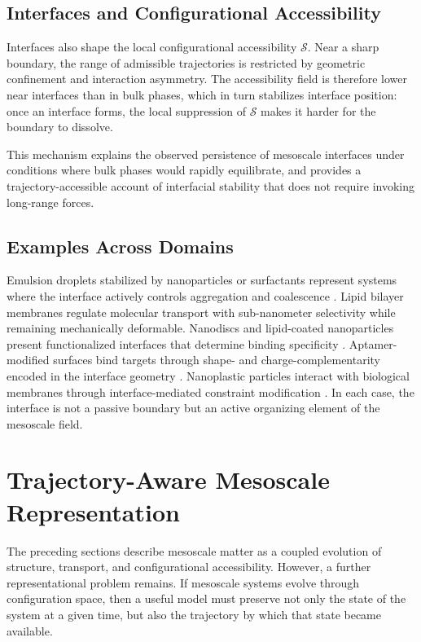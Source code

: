 \documentclass[11pt, a4paper, twocolumn]{article}
\newcommand{\Sfield}{\mathcal{S}}
\begin{document}
\subsection{Interfaces and Configurational Accessibility}

Interfaces also shape the local configurational accessibility $\Sfield$.
Near a sharp boundary, the range of admissible trajectories is restricted by
geometric confinement and interaction asymmetry. The accessibility field is
therefore lower near interfaces than in bulk phases, which in turn stabilizes
interface position: once an interface forms, the local suppression of $\Sfield$
makes it harder for the boundary to dissolve.

This mechanism explains the observed persistence of mesoscale interfaces under
conditions where bulk phases would rapidly equilibrate, and provides a
trajectory-accessible account of interfacial stability that does not require
invoking long-range forces.

\subsection{Examples Across Domains}

Emulsion droplets stabilized by nanoparticles or surfactants represent systems
where the interface actively controls aggregation and coalescence
\cite{larson2012,ye2026}. Lipid bilayer membranes regulate molecular transport
with sub-nanometer selectivity while remaining mechanically deformable. Nanodiscs
and lipid-coated nanoparticles present functionalized interfaces that determine
binding specificity \cite{villano2026}. Aptamer-modified surfaces bind targets
through shape- and charge-complementarity encoded in the interface geometry
\cite{poliukhina2026}. Nanoplastic particles interact with biological membranes
through interface-mediated constraint modification \cite{qian2026}. In each case,
the interface is not a passive boundary but an active organizing element of the
mesoscale field.

\section{Trajectory-Aware Mesoscale Representation}

The preceding sections describe mesoscale matter as a coupled evolution of
structure, transport, and configurational accessibility. However, a further
representational problem remains. If mesoscale systems evolve through
configuration space, then a useful model must preserve not only the state of
the system at a given time, but also the trajectory by which that state became
available.
\end{document}
